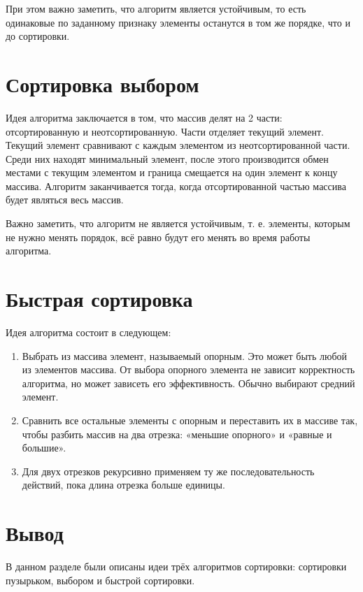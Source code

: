 \documentclass[12pt]{report}
\begin{document}
При этом важно заметить, что алгоритм является устойчивым, то есть одинаковые по заданному признаку элементы останутся в том же порядке, что и до сортировки.

\section{Сортировка выбором}

Идея алгоритма заключается в том, что массив делят на 2 части: отсортированную и неотсортированную. Части отделяет текущий элемент. Текущий элемент сравнивают с каждым элементом из неотсортированной части. Среди них находят минимальный элемент, после этого производится обмен местами с текущим элементом и граница смещается на один элемент к концу массива. Алгоритм заканчивается тогда, когда отсортированной частью массива будет являться весь массив. 

Важно заметить, что алгоритм не является устойчивым, т. е. элементы, которым не нужно менять порядок, всё равно будут его менять во время работы алгоритма.

\section{Быстрая сортировка}

Идея алгоритма состоит в следующем:

\begin{enumerate}
	\item Выбрать из массива элемент, называемый опорным. Это может быть любой из элементов массива. От выбора опорного элемента не зависит корректность алгоритма, но может зависеть его эффективность. Обычно выбирают средний элемент.
	\item Сравнить все остальные элементы с опорным и переставить их в массиве так, чтобы разбить массив на два отрезка: «меньшие опорного» и «равные и большие».
	\item Для двух отрезков рекурсивно применяем ту же последовательность действий, пока длина отрезка больше единицы.
\end{enumerate}

\section{Вывод}

В данном разделе были описаны идеи трёх алгоритмов сортировки: сортировки пузырьком, выбором и быстрой сортировки.
	
\newpage
\end{document}
